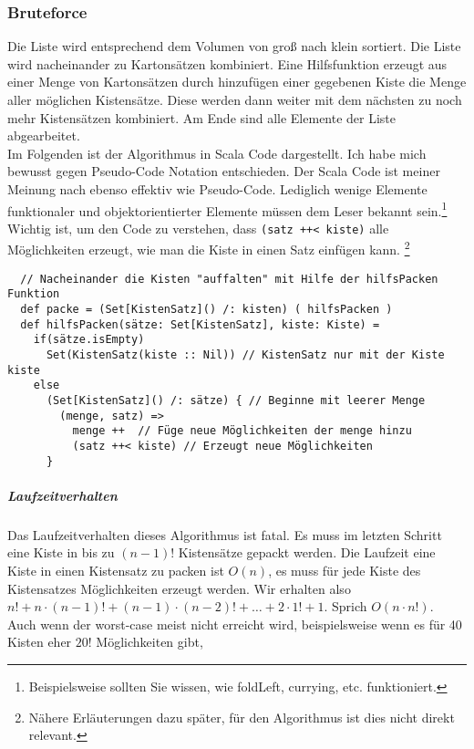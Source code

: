 \subsubsection{Bruteforce}
\lstset{language=Scala} %
\lstset{basicstyle=\scriptsize}
Die Liste wird entsprechend dem Volumen von groß nach klein sortiert.
Die Liste wird nacheinander zu Kartonsätzen kombiniert.
Eine Hilfsfunktion erzeugt aus einer Menge von Kartonsätzen durch hinzufügen einer gegebenen Kiste die Menge aller möglichen Kistensätze.
Diese werden dann weiter mit dem nächsten zu noch mehr Kistensätzen kombiniert.
Am Ende sind alle Elemente der Liste abgearbeitet. \\
Im Folgenden ist der Algorithmus in Scala Code dargestellt. Ich habe mich bewusst gegen Pseudo-Code Notation entschieden.
Der Scala Code ist meiner Meinung nach ebenso effektiv wie Pseudo-Code.
Lediglich wenige Elemente funktionaler und objektorientierter Elemente müssen dem Leser bekannt sein.\footnote{Beispielsweise sollten Sie wissen, wie foldLeft, currying, etc. funktioniert.}\\
Wichtig ist, um den Code zu verstehen, dass \lstinline|(satz ++< kiste)| alle Möglichkeiten erzeugt, wie man die Kiste in einen Satz einfügen kann.
\footnote{Nähere Erläuterungen dazu später, für den Algorithmus ist dies nicht direkt relevant.}
\lstset{language=Scala}
\lstset{basicstyle=\small}
\begin{lstlisting}
  // Nacheinander die Kisten "auffalten" mit Hilfe der hilfsPacken Funktion
  def packe = (Set[KistenSatz]() /: kisten) ( hilfsPacken )
  def hilfsPacken(sätze: Set[KistenSatz], kiste: Kiste) =
    if(sätze.isEmpty)
      Set(KistenSatz(kiste :: Nil)) // KistenSatz nur mit der Kiste kiste
    else
      (Set[KistenSatz]() /: sätze) { // Beginne mit leerer Menge
        (menge, satz) =>
          menge ++  // Füge neue Möglichkeiten der menge hinzu
          (satz ++< kiste) // Erzeugt neue Möglichkeiten
      }
\end{lstlisting}
\subparagraph{Laufzeitverhalten}
Das Laufzeitverhalten dieses Algorithmus ist fatal. Es muss im letzten Schritt eine Kiste in bis zu $(n-1)!$ Kistensätze gepackt werden.
Die Laufzeit eine Kiste in einen Kistensatz zu packen ist $O(n)$, es muss für jede Kiste des Kistensatzes Möglichkeiten erzeugt werden.
Wir erhalten also $n! + n \cdot (n-1)! +  (n-1) \cdot (n-2)! + \dots + 2 \cdot 1! + 1$. Sprich $O(n \cdot n!)$. \\
Auch wenn der worst-case meist nicht erreicht wird, beispielsweise wenn es für 40 Kisten eher $20!$ Möglichkeiten gibt,
